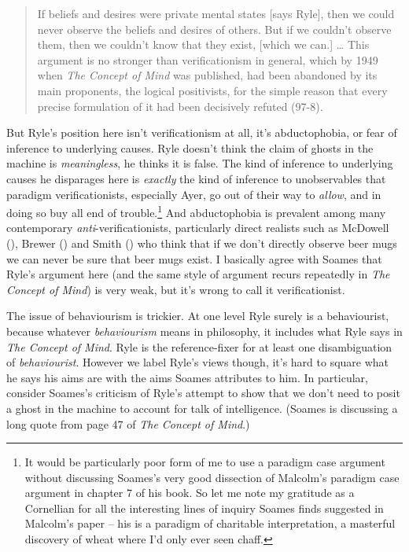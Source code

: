 \documentclass[
  10pt,
  letterpaper,
  DIV=11,
  numbers=noendperiod,
  twoside]{scrartcl}
\begin{document}
\begin{quote}
If beliefs and desires were private mental states {[}says Ryle{]}, then
we could never observe the beliefs and desires of others. But if we
couldn't observe them, then we couldn't know that they exist, {[}which
we can.{]} \ldots{} This argument is no stronger than verificationism in
general, which by 1949 when \emph{The Concept of Mind} was published,
had been abandoned by its main proponents, the logical positivists, for
the simple reason that every precise formulation of it had been
decisively refuted (97-8).
\end{quote}

But Ryle's position here isn't verificationism at all, it's
abductophobia, or fear of inference to underlying causes. Ryle doesn't
think the claim of ghosts in the machine is \emph{meaningless}, he
thinks it is false. The kind of inference to underlying causes he
disparages here is \emph{exactly} the kind of inference to unobservables
that paradigm verificationists, especially Ayer, go out of their way to
\emph{allow}, and in doing so buy all end of trouble.\footnote{It would
  be particularly poor form of me to use a paradigm case argument
  without discussing Soames's very good dissection of Malcolm's paradigm
  case argument in chapter 7 of his book. So let me note my gratitude as
  a Cornellian for all the interesting lines of inquiry Soames finds
  suggested in Malcolm's paper -- his is a paradigm of charitable
  interpretation, a masterful discovery of wheat where I'd only ever
  seen chaff.} And abductophobia is prevalent among many contemporary
\emph{anti}-verificationists, particularly direct realists such as
McDowell (), Brewer
() and Smith
() who think that if we don't directly
observe beer mugs we can never be sure that beer mugs exist. I basically
agree with Soames that Ryle's argument here (and the same style of
argument recurs repeatedly in \emph{The Concept of Mind}) is very weak,
but it's wrong to call it verificationist.

The issue of behaviourism is trickier. At one level Ryle surely is a
behaviourist, because whatever \emph{behaviourism} means in philosophy,
it includes what Ryle says in \emph{The Concept of Mind}. Ryle is the
reference-fixer for at least one disambiguation of \emph{behaviourist}.
However we label Ryle's views though, it's hard to square what he says
his aims are with the aims Soames attributes to him. In particular,
consider Soames's criticism of Ryle's attempt to show that we don't need
to posit a ghost in the machine to account for talk of intelligence.
(Soames is discussing a long quote from page 47 of \emph{The Concept of
Mind}.)
\end{document}
